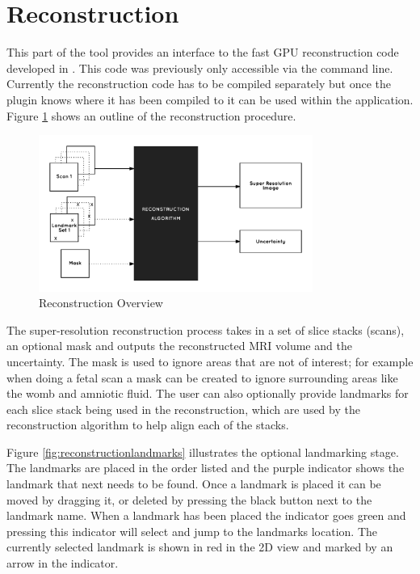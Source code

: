 \clearpage
\section{Reconstruction}\label{implementation:reconstruction}
This part of the tool provides an interface to the fast GPU reconstruction code developed in \cite{uncertaintysvd}. This code was previously only accessible via the command line. Currently the reconstruction code has to be compiled separately but once the plugin knows where it has been compiled to it can be used within the application. Figure \ref{fig:reconstruction_overview} shows an outline of the reconstruction procedure.

\begin{figure}[h]
  \centering
  \includegraphics[width=0.8\textwidth]{images/reconstruction_overview.png}
  \caption{Reconstruction Overview}
  \label{fig:reconstruction_overview}
\end{figure}

The super-resolution reconstruction process takes in a set of slice stacks (scans), an optional mask and outputs the reconstructed MRI volume and the uncertainty. The mask is used to ignore areas that are not of interest; for example when doing a fetal scan a mask can be created to ignore surrounding areas like the womb and amniotic fluid. The user can also optionally provide landmarks for each slice stack being used in the reconstruction, which are used by the reconstruction algorithm to help align each of the stacks.

Figure \ref{fig:reconstructionlandmarks} illustrates the optional landmarking stage. The landmarks are placed in the order listed and the purple indicator shows the landmark that next needs to be found. Once a landmark is placed it can be moved by dragging it, or deleted by pressing the black button next to the landmark name. When a landmark has been placed the indicator goes green and pressing this indicator will select and jump to the landmarks location. The currently selected landmark is shown in red in the 2D view and marked by an arrow in the indicator.


